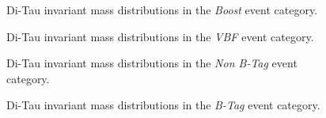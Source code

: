 \begin{figure}[ht]
\caption{Di-Tau invariant mass distributions in the \emph{Boost} event category.}
\label{fig:smmassboosted}
\end{figure}

\begin{figure}[ht]
\caption{Di-Tau invariant mass distributions in the \emph{VBF} event category.}
\label{fig:smmassvbf}
\end{figure}

\begin{figure}[ht]

\caption{Di-Tau invariant mass distributions in the \emph{Non B-Tag} event category.}
\label{fig:mssmmasswobtag}
\end{figure}

\begin{figure}[ht]

\caption{Di-Tau invariant mass distributions in the \emph{B-Tag} event category.}
\label{fig:mssmmasswbtag}
\end{figure}


